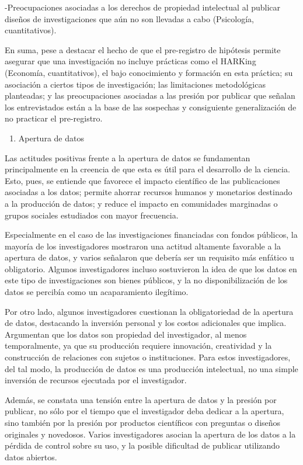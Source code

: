 \documentclass[
  letterpaper,
  DIV=11,
  numbers=noendperiod]{scrreprt}
\providecommand{\tightlist}{%
  \setlength{\itemsep}{0pt}\setlength{\parskip}{0pt}}\usepackage{longtable,booktabs,array}
\begin{document}
-Preocupaciones asociadas a los derechos de propiedad intelectual al
publicar diseños de investigaciones que aún no son llevadas a cabo
(Psicología, cuantitativos).

En suma, pese a destacar el hecho de que el pre-registro de hipótesis
permite asegurar que una investigación no incluye prácticas como el
HARKing (Economía, cuantitativos), el bajo conocimiento y formación en
esta práctica; su asociación a ciertos tipos de investigación; las
limitaciones metodológicas planteadas; y las preocupaciones asociadas a
las presión por publicar que señalan los entrevistados están a la base
de las sospechas y consiguiente generalización de no practicar el
pre-registro.

\begin{enumerate}
\def\labelenumi{\alph{enumi})}
\setcounter{enumi}{2}
\tightlist
\item
  Apertura de datos
\end{enumerate}

Las actitudes positivas frente a la apertura de datos se fundamentan
principalmente en la creencia de que esta es útil para el desarrollo de
la ciencia. Esto, pues, se entiende que favorece el impacto científico
de las publicaciones asociadas a los datos; permite ahorrar recursos
humanos y monetarios destinado a la producción de datos; y reduce el
impacto en comunidades marginadas o grupos sociales estudiados con mayor
frecuencia.

Especialmente en el caso de las investigaciones financiadas con fondos
públicos, la mayoría de los investigadores mostraron una actitud
altamente favorable a la apertura de datos, y varios señalaron que
debería ser un requisito más enfático u obligatorio. Algunos
investigadores incluso sostuvieron la idea de que los datos en este tipo
de investigaciones son bienes públicos, y la no disponibilización de los
datos se percibía como un acaparamiento ilegítimo.

Por otro lado, algunos investigadores cuestionan la obligatoriedad de la
apertura de datos, destacando la inversión personal y los costos
adicionales que implica. Argumentan que los datos son propiedad del
investigador, al menos temporalmente, ya que su producción requiere
innovación, creatividad y la construcción de relaciones con sujetos o
instituciones. Para estos investigadores, del tal modo, la producción de
datos es una producción intelectual, no una simple inversión de recursos
ejecutada por el investigador.

Además, se constata una tensión entre la apertura de datos y la presión
por publicar, no sólo por el tiempo que el investigador deba dedicar a
la apertura, sino también por la presión por productos científicos con
preguntas o diseños originales y novedosos. Varios investigadores
asocian la apertura de los datos a la pérdida de control sobre su uso, y
la posible dificultad de publicar utilizando datos abiertos.
\end{document}
